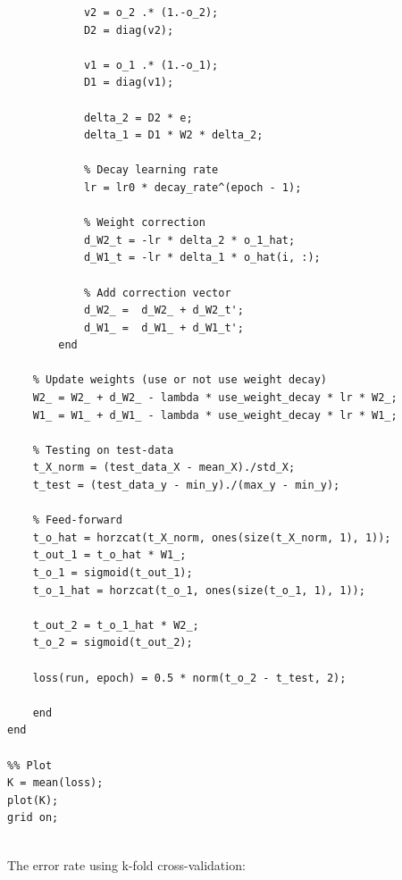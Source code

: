 \documentclass[12pt]{article}
\begin{document}
\begin{itemize}
\begin{lstlisting}
            v2 = o_2 .* (1.-o_2);
            D2 = diag(v2);

            v1 = o_1 .* (1.-o_1);
            D1 = diag(v1);

            delta_2 = D2 * e;
            delta_1 = D1 * W2 * delta_2;

            % Decay learning rate
            lr = lr0 * decay_rate^(epoch - 1);
            
            % Weight correction
            d_W2_t = -lr * delta_2 * o_1_hat;
            d_W1_t = -lr * delta_1 * o_hat(i, :);
            
            % Add correction vector
            d_W2_ =  d_W2_ + d_W2_t';
            d_W1_ =  d_W1_ + d_W1_t';
        end

    % Update weights (use or not use weight decay)
    W2_ = W2_ + d_W2_ - lambda * use_weight_decay * lr * W2_;
    W1_ = W1_ + d_W1_ - lambda * use_weight_decay * lr * W1_;        
        
    % Testing on test-data   
    t_X_norm = (test_data_X - mean_X)./std_X;
    t_test = (test_data_y - min_y)./(max_y - min_y);        

    % Feed-forward
    t_o_hat = horzcat(t_X_norm, ones(size(t_X_norm, 1), 1));
    t_out_1 = t_o_hat * W1_;
    t_o_1 = sigmoid(t_out_1);
    t_o_1_hat = horzcat(t_o_1, ones(size(t_o_1, 1), 1));

    t_out_2 = t_o_1_hat * W2_;
    t_o_2 = sigmoid(t_out_2);

    loss(run, epoch) = 0.5 * norm(t_o_2 - t_test, 2);       
   
    end         
end

%% Plot
K = mean(loss);
plot(K);
grid on;


    \end{lstlisting}
\end{itemize}
    The error rate using k-fold cross-validation:
\end{document}
